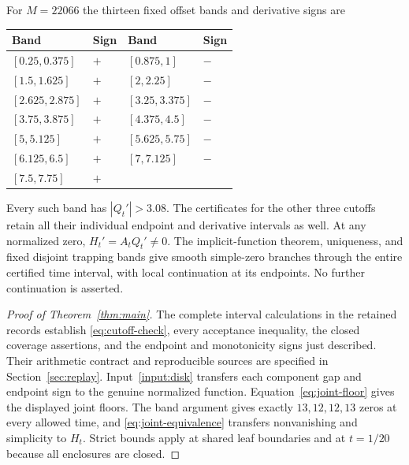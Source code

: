 \documentclass[11pt]{article}
\numberwithin{equation}{section}
\theoremstyle{definition}
\theoremstyle{remark}
\begin{document}
For $M=22066$ the thirteen fixed offset bands and derivative signs are
\begin{center}
\begin{tabular}{ll@{\qquad}ll}
\toprule
Band & Sign & Band & Sign\\
\midrule
$[0.25,0.375]$ & $+$ & $[0.875,1]$ & $-$\\
$[1.5,1.625]$ & $+$ & $[2,2.25]$ & $-$\\
$[2.625,2.875]$ & $+$ & $[3.25,3.375]$ & $-$\\
$[3.75,3.875]$ & $+$ & $[4.375,4.5]$ & $-$\\
$[5,5.125]$ & $+$ & $[5.625,5.75]$ & $-$\\
$[6.125,6.5]$ & $+$ & $[7,7.125]$ & $-$\\
$[7.5,7.75]$ & $+$ & & \\
\bottomrule
\end{tabular}
\end{center}
Every such band has $|Q_t'|>3.08$. The certificates for the other
three cutoffs retain all their individual endpoint and derivative
intervals as well. At any normalized zero,
$H_t'=A_tQ_t'\ne0$. The implicit-function theorem, uniqueness,
and fixed disjoint trapping bands give smooth simple-zero branches
through the entire certified time interval, with local continuation
at its endpoints. No further continuation is asserted.

\begin{proof}[Proof of Theorem~\ref{thm:main}]
The complete interval calculations in the retained records
\cite{micro4,micro5} establish \eqref{eq:cutoff-check}, every
acceptance inequality, the closed coverage assertions, and the
endpoint and monotonicity signs just described. Their arithmetic
contract and reproducible sources are specified in
Section~\ref{sec:replay}. Input~\ref{input:disk} transfers each
component gap and endpoint sign to the genuine normalized function.
Equation~\eqref{eq:joint-floor} gives the displayed joint floors.
The band argument gives exactly $13,12,12,13$ zeros at every
allowed time, and \eqref{eq:joint-equivalence} transfers
nonvanishing and simplicity to $H_t$. Strict bounds apply at shared
leaf boundaries and at $t=1/20$ because all enclosures are closed.
\end{proof}
\end{document}

